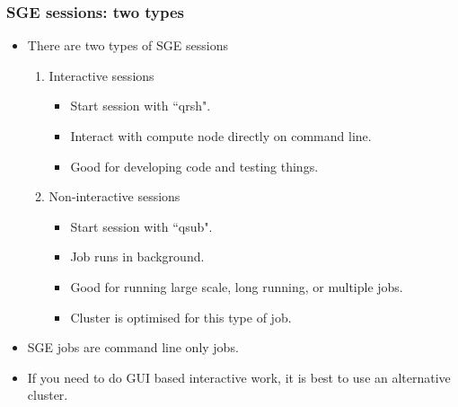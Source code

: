 \documentclass{beamer}
\begin{document}
\begin{frame}
\frametitle{SGE sessions: two types}
\begin{itemize}
\item There are two types of SGE sessions
\begin{enumerate}
\item Interactive sessions
\begin{itemize}
\item Start session with ``qrsh".
\item Interact with compute node directly on command line.
\item Good for developing code and testing things.
\end{itemize}
\item Non-interactive sessions
\begin{itemize}
\item Start session with ``qsub".
\item Job runs in background.
\item Good for running large scale, long running, or multiple jobs.
\item Cluster is optimised for this type of job.
\end{itemize}
\end{enumerate}
\item SGE jobs are command line only jobs.
\item If you need to do GUI based interactive work, it is best to use an alternative cluster. 
\end{itemize}
\end{frame}
\end{document}
